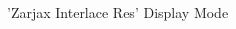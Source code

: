 \clearpage
\begin{figure}[H]
    \centering
    \begin{adjustbox}{width=12cm,center}
    \end{adjustbox}
\caption{'Zarjax Interlace Res' Display Mode}
\end{figure}
